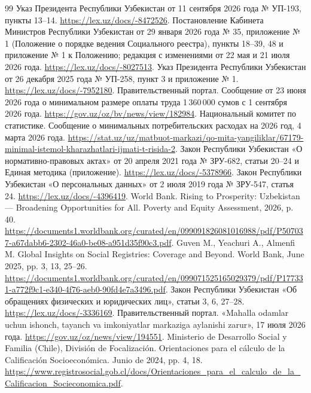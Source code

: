 \documentclass[12pt,a4paper]{extarticle}
\begin{document}
\renewcommand{\refname}{Источники}
\begingroup\fontsize{12bp}{14.4bp}\selectfont
\begin{thebibliography}{99}
 Указ Президента Республики Узбекистан от 11 сентября 2026 года № УП-193, пункты 13–14. \url{https://lex.uz/docs/-8472526}.
 Постановление Кабинета Министров Республики Узбекистан от 29 января 2026 года № 35, приложение № 1 (Положение о порядке ведения Социального реестра), пункты 18–39, 48 и приложение № 1 к Положению; редакция с изменениями от 22 мая и 21 июля 2026 года. \url{https://lex.uz/docs/-8027513}.
 Указ Президента Республики Узбекистан от 26 декабря 2025 года № УП-258, пункт 3 и приложение № 1. \url{https://lex.uz/docs/-7952180}.
 Правительственный портал. Сообщение от 23 июня 2026 года о минимальном размере оплаты труда 1\,360\,000 сумов с 1 сентября 2026 года. \url{https://gov.uz/oz/bv/news/view/182984}.
 Национальный комитет по статистике. Сообщение о минимальных потребительских расходах на 2026 год, 4 марта 2026 года. \url{https://stat.uz/uz/matbuot-markazi/qo-mita-yangiliklar/67179-minimal-istemol-kharazhatlari-ijmati-t-risida-2}.
 Закон Республики Узбекистан «О нормативно-правовых актах» от 20 апреля 2021 года № ЗРУ-682, статьи 20–24 и Единая методика (приложение). \url{https://lex.uz/docs/-5378966}.
 Закон Республики Узбекистан «О персональных данных» от 2 июля 2019 года № ЗРУ-547, статья 24. \url{https://lex.uz/docs/-4396419}.
 World Bank. Rising to Prosperity: Uzbekistan — Broadening Opportunities for All. Poverty and Equity Assessment, 2026, p. 40. \url{https://documents1.worldbank.org/curated/en/099091826081016988/pdf/P507037-a67dabb6-2302-46a0-be08-a951d35f90c3.pdf}.
 Guven M., Yeachuri A., Almenfi M. Global Insights on Social Registries: Coverage and Beyond. World Bank, June 2025, pp. 3, 13, 25–26. \url{https://documents1.worldbank.org/curated/en/099071525165029379/pdf/P177331-a772f9c1-e340-4f76-aeb0-90fd4e7a3496.pdf}.
 Закон Республики Узбекистан «Об обращениях физических и юридических лиц», статьи 3, 6, 27–28. \url{https://lex.uz/docs/-3336169}.
 Правительственный портал. «Mahalla odamlar uchun ishonch, tayanch va imkoniyatlar markaziga aylanishi zarur», 17 июля 2026 года. \url{https://gov.uz/oz/news/view/194551}.
 Ministerio de Desarrollo Social y Familia (Chile), División de Focalización. Orientaciones para el cálculo de la Calificación Socioeconómica. Junio de 2024, pp. 4, 18. \url{https://www.registrosocial.gob.cl/docs/Orientaciones_para_el_calculo_de_la_Calificacion_Socieconomica.pdf}.
\end{thebibliography}\endgroup
\end{document}
